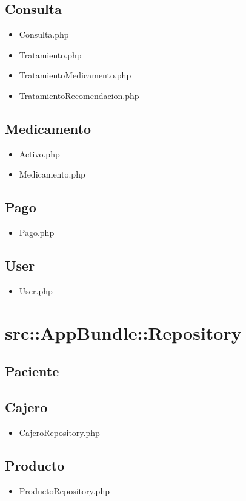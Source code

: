 		\subsection{Consulta}
		\begin{itemize}
			\item Consulta.php
			\item Tratamiento.php
			\item TratamientoMedicamento.php
			\item TratamientoRecomendacion.php
		\end{itemize}
		\subsection{Medicamento}
		\begin{itemize}
			\item Activo.php
			\item Medicamento.php
		\end{itemize}
		\subsection{Pago}
		\begin{itemize}
			\item Pago.php
		\end{itemize}
		\subsection{User}
		\begin{itemize}
			\item User.php
		\end{itemize}
		
\section{src::AppBundle::Repository}
	
	\subsection{Paciente}
		\subsection{Cajero}
		\begin{itemize}
			\item CajeroRepository.php
		\end{itemize}
		\subsection{Producto}
		\begin{itemize}
			\item ProductoRepository.php
		\end{itemize}
